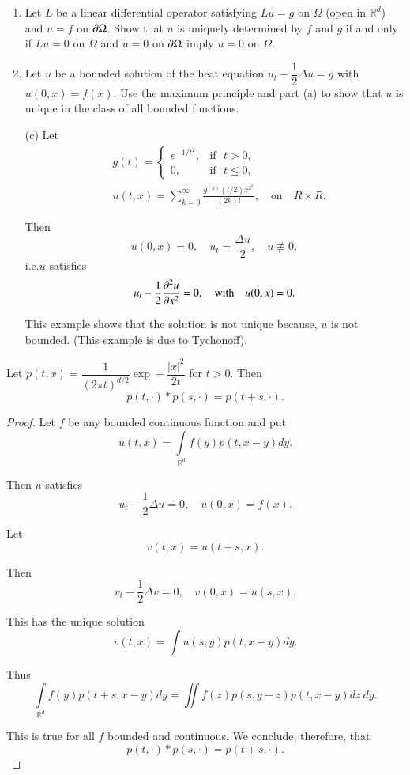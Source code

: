 \begin{exercise}%
\begin{enumerate}
\renewcommand{\theenumi}{\alph{enumi}}
\renewcommand{\labelenumi}{(\theenumi)}
\item Let $L$ be a linear differential operator satisfying $Lu=g$ on
  $\Omega$ (open in $\mathbb{R}^{d}$) and $u=f$ on $\partial \Omega$. Show
  that $u$ is uniquely determined by $f$ and $g$ if and only if $Lu=0$
  on $\Omega$ and $u=0$ on $\partial \Omega$ imply $u=0$ on $\Omega$.

\item Let $u$ be a bounded solution of the heat equation
  $u_{t}-\dfrac{1}{2}\Delta u=g$ with $u(0,x)=f(x)$. Use the maximum
  principle and part (a) to show that $u$ is unique in the class of
  all bounded functions. 

\item[(c)] Let
\begin{align*}
& g(t)=
\begin{cases}
e^{-1/t^{2}}, &\text{if~ } t>0,\\
0, & \text{if~ } t\leq 0,
\end{cases}\\
&
u(t,x)=\sum^{\infty}_{k=0}\frac{g^{(k)}(t/2)x^{2^{k}}}{(2k)!},\quad\text{on}\quad 
R\times R.
\end{align*}\pageoriginale

Then
$$
u(0,x)=0,\quad u_{t}=\frac{\Delta u}{2},\quad u\nequiv 0,
$$
i.e.\@ $u$ satisfies
$$
u_{t}-\frac{1}{2}\frac{\partial^{2}u}{\partial x^{2}}=0,\quad\text{with}\quad
u(0,x)=0.
$$

This example shows that the solution is not unique because, $u$ is not
bounded. (This example is due to Tychonoff).
\end{enumerate}
\end{exercise}

\begin{lemma}\label{chap1-lem1}
Let $p(t,x)=\dfrac{1}{(2\pi t)^{d/2}}\exp -\dfrac{|x|^{2}}{2t}$ for
$t>0$. Then
$$
p(t,\cdot)\ast p(s,\cdot) =p(t+s,\cdot).
$$
\end{lemma}

\begin{proof}
Let $f$ be any bounded continuous function and put
$$
u(t,x)=\int\limits_{\mathbb{R}^{d}}f(y)p(t,x-y)dy.
$$

Then $u$ satisfies
$$
u_{t}-\dfrac{1}{2}\Delta u=0,\quad u(0,x)=f(x).
$$

Let
$$
v(t,x)=u(t+s,x).
$$

Then
$$
v_{t}-\dfrac{1}{2}\Delta v=0,\quad v(0,x)=u(s,x).
$$

This has the unique solution
$$
v(t,x)=\int u(s,y)p(t,x-y)dy.
$$

Thus
$$
\int\limits_{\mathbb{R}^{d}}f(y)p(t+s,x-y)dy=\iint
f(z)p(s,y-z)p(t,x-y)dz\ dy.
$$\pageoriginale

This is true for all $f$ bounded and continuous. We conclude,
therefore, that
$$
p(t,\cdot)\ast p(s,\cdot)=p(t+s,\cdot).
$$
\end{proof}

